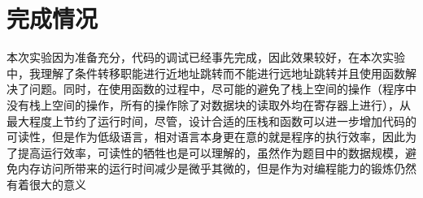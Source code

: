 \documentclass[UTF8,a4paper]{ctexart}
\begin{document}
\section{完成情况}
本次实验因为准备充分，代码的调试已经事先完成，因此效果较好，在本次实验中，我理解了条件转移职能进行近地址跳转而不能进行远地址跳转并且使用函数解决了问题。同时，在使用函数的过程中，尽可能的避免了栈上空间的操作（程序中没有栈上空间的操作，所有的操作除了对数据块的读取外均在寄存器上进行），从最大程度上节约了运行时间，尽管，设计合适的压栈和函数可以进一步增加代码的可读性，但是作为低级语言，相对语言本身更在意的就是程序的执行效率，因此为了提高运行效率，可读性的牺牲也是可以理解的，虽然作为题目中的数据规模，避免内存访问所带来的运行时间减少是微乎其微的，但是作为对编程能力的锻炼仍然有着很大的意义
\end{document}
